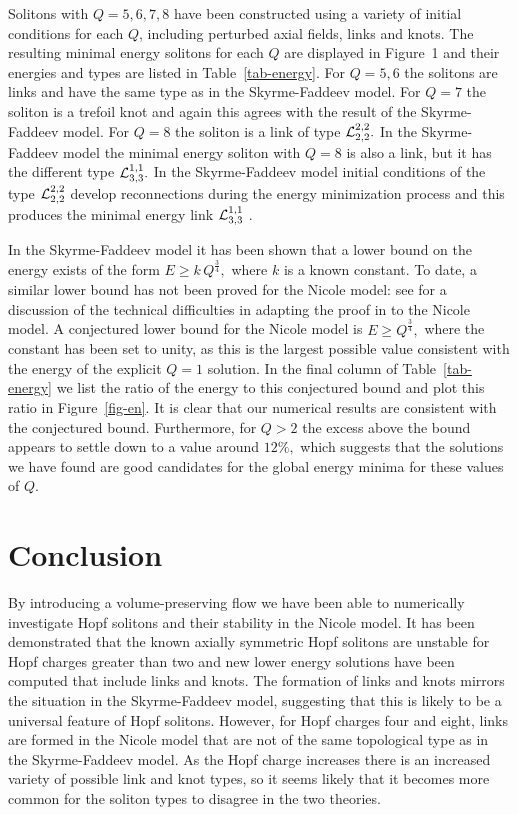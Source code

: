 \documentclass[12pt]{article}
\newcommand{\news}{\setcounter{equation}{0}\quad}
\begin{document}
Solitons with $Q=5,6,7,8$ have been constructed using a 
variety of initial conditions for each $Q$, including perturbed axial
fields, links and knots. The resulting minimal energy solitons
for each $Q$ are displayed in Figure~1 and their energies and
types are listed in Table~\ref{tab-energy}. 
For $Q=5,6$ the solitons are links and have the same type as in
the Skyrme-Faddeev model. For $Q=7$ the soliton is a trefoil knot and
again this agrees with the result of the Skyrme-Faddeev model.
For $Q=8$ the soliton is a link of type  ${\cal L}_{2,2}^{2,2}.$
In the Skyrme-Faddeev model the minimal energy soliton with 
$Q=8$ is also a link,
but it has the different type ${\cal L}_{3,3}^{1,1}.$  In the
Skyrme-Faddeev model initial conditions of the type 
${\cal L}_{2,2}^{2,2}$ develop reconnections during the energy
minimization process and this produces the minimal energy link
${\cal L}_{3,3}^{1,1}$ \cite{Su}.


In the Skyrme-Faddeev model it has been shown \cite{VK} 
that a lower bound on the energy exists of the form 
$E\ge k\, Q^\frac{3}{4},$ where $k$ is a known
constant. To date, a similar lower bound has not been proved 
for the Nicole model: see \cite{ASVW} for a discussion of the 
technical difficulties in adapting the proof in \cite{VK} to 
the Nicole model. A conjectured lower bound for the Nicole model
is $E\ge Q^\frac{3}{4},$ where the constant has been set to 
unity, as this is the
largest possible value consistent with the energy of the explicit 
$Q=1$ solution. In the final column of Table~\ref{tab-energy}
we list the ratio of the energy to this conjectured bound and plot
this ratio in Figure~\ref{fig-en}. It is clear that our numerical
results are consistent with the conjectured bound. Furthermore, 
for $Q>2$ the excess above the bound appears to settle down to 
a value around $12\%,$ which suggests that the solutions we have
found are good candidates for the global energy minima for these
values of $Q.$


\section{Conclusion}\news
By introducing a volume-preserving flow we have been able
to numerically investigate Hopf solitons and their stability in the
Nicole model. It has been demonstrated that the known axially
symmetric Hopf solitons are unstable for Hopf charges greater
than two and new lower energy solutions have been computed
that include links and knots. The formation of links and knots
mirrors the situation in the Skyrme-Faddeev model, suggesting
that this is likely to be a universal feature of Hopf solitons.
However, for Hopf charges four and eight, links are formed 
in the Nicole model
that are not of the same topological type as in the Skyrme-Faddeev
model. As the Hopf charge increases there is an increased variety
of possible link and knot types, so it seems likely that it becomes
more common for the soliton types to disagree in the two theories.
\end{document}
